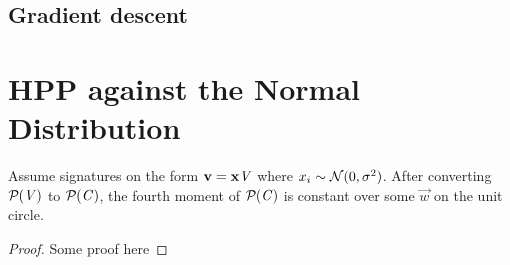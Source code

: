 \subsection{Gradient descent}
\section{HPP against the Normal Distribution}

\begin{lemma}[Lemma 1]
\label{hpp_norm_lemma}
Assume signatures on the form $\mathbf{v} = \mathbf{x} \mathit{V}$ where $x_i \sim \mathcal{N}(0, \sigma^2)$. After converting $\mathcal{P}_{}(\mathit{V})$ to $\mathcal{P}_{}(\mathit{C})$, the fourth moment of $\mathcal{P}_{}(\mathit{C})$ is constant over some $\vec{w}$ on the unit circle.
\end{lemma}
\begin{proof}
    Some proof here
\end{proof}
